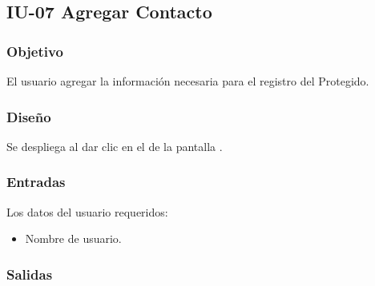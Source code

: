 \newpage
\subsection{IU-07 Agregar Contacto}

\subsubsection{Objetivo}
	El usuario agregar la información necesaria para el registro del Protegido.

\subsubsection{Diseño}
	Se despliega al dar clic en el  de la pantalla .


\subsubsection{Entradas}
Los datos del usuario requeridos:
\begin{itemize}
	\item Nombre de usuario.
\end{itemize}

\subsubsection{Salidas}
\begin{Citemize}
	\item {}
	\item {}
	\item {}
\end{Citemize}

